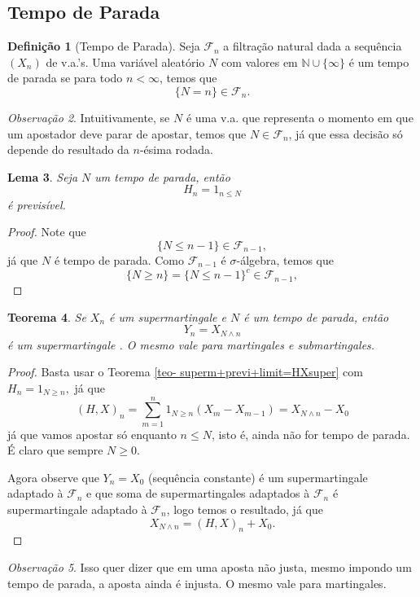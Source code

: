 \documentclass[12pt,a4paper,oneside]{book}
\newtheorem{theorem}{Teorema}[section]
\newtheorem{lemma}[theorem]{Lema}
\theoremstyle{definition}
\newtheorem{definition}[theorem]{Defini\c{c}\~ao}
\theoremstyle{remark}
\newtheorem{remark}[theorem]{Observa\c{c}\~ao}
\numberwithin{equation}{section}
\newcommand{\N}{\mathbb{N}}
\newcommand{\F}{\mathcal{F}}
\begin{document}
\subsection{Tempo de Parada}

\begin{definition}[Tempo de Parada]\label{def- tempo de parada} 
Seja $\F_n$ a filtração natural dada a sequência $(X_n)$ de v.a.'s. Uma variável aleatório $N$ com valores em $\N\cup\{\infty\}$ é um tempo de parada se para todo $n<\infty$, temos que
$$\{N=n\}\in \F_n. $$
\end{definition}


\begin{remark}
Intuitivamente, se $N$ é uma v.a. que representa o momento em que um apostador deve parar de apostar, temos que $N\in \F_n$, já que essa decisão só depende do resultado da $n$-ésima rodada.
\end{remark}

\begin{lemma}
Seja $N$ um tempo de parada, então 
$$ H_n = 1_{n\leq N} $$
é previsível.
\end{lemma}
\begin{proof}
Note que 
$$\{N\leq n-1\} \in \F_{n-1}, $$
já que $N$ é tempo de parada. Como $\F_{n-1}$ é $\sigma$-álgebra, temos que 
$$\{N\geq n\} = \{N\leq n-1\}^c \in \F_{n-1}, $$
\end{proof}

\begin{theorem}\label{teo- super+stoptime=super} Se $X_n$ é um supermartingale e $N$ é um tempo de parada, então 
$$Y_n = X_{N\wedge n} $$
é um supermartingale . O mesmo vale para martingales e submartingales.
\end{theorem}


\begin{proof}
Basta usar o Teorema \ref{teo- superm+previ+limit=HXsuper} com $H_n = 1_{N\geq n},$ já que
$$(H,X)_n =  \sum^n_{m=1}1_{N\geq n}(X_m - X_{m-1}) = X_{N\wedge n} - X_0 $$
já que vamos apostar só enquanto $n\leq N$, isto é, ainda não for tempo de parada. É claro que sempre  $N\geq 0$.

Agora observe que $Y_n = X_0$ (sequência constante) é um supermartingale adaptado à $\F_n$ e que soma de supermartingales adaptados à $\F_n$ é supermartingale adaptado à $\F_n$, logo temos o resultado, já que
$$ X_{N\wedge n} = (H,X)_n + X_0. $$
\end{proof}
\begin{remark}
Isso quer dizer que em uma aposta não justa, mesmo impondo um tempo de parada, a aposta ainda é injusta. O mesmo vale para martingales.
\end{remark}
\end{document}
